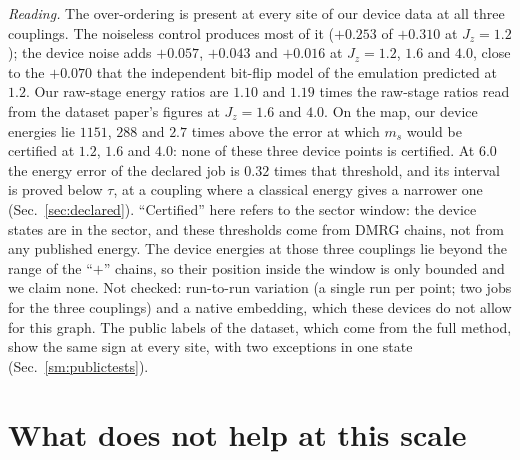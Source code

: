 \documentclass[aps,prx,onecolumn,10pt,nofootinbib,longbibliography,floatfix]{revtex4-2}
\theoremstyle{remark}
\newcommand{\Jz}{J_z}
\newcommand{\ms}{m_s}
\begin{document}
\emph{Reading.} The over-ordering is present at every site of our device data at all three couplings. The noiseless
control produces most of it ($+0.253$ of $+0.310$ at $\Jz=1.2$); the device noise adds $+0.057$, $+0.043$ and $+0.016$ at %
$\Jz=1.2$, $1.6$ and $4.0$, close to the $+0.070$ that the independent bit-flip model of the emulation predicted at %
$1.2$. Our raw-stage energy ratios are $1.10$ and $1.19$ times the raw-stage ratios read from the dataset paper's figures %
at $\Jz=1.6$ and $4.0$. On the map, our device energies lie $1151$, $288$ and $2.7$ times above the error at which $\ms$ %
would be certified at $1.2$, $1.6$ and $4.0$: none of these three device points is certified. At $6.0$ the energy error %
of the declared job is $0.32$ times that threshold, and its interval is proved below $\tau$, at a coupling where a %
classical energy gives a narrower one (Sec.~\ref{sec:declared}). ``Certified'' here refers to the sector window:
the device states are in the sector, and these thresholds come from DMRG chains, not from any published energy.
The device energies at those three couplings lie beyond the range of %
the ``$+$'' chains, so their position inside the window is only bounded and we claim none. Not checked: run-to-run
variation (a single run per point; two jobs for the three couplings) and a native embedding, which these devices do not allow for this graph.
The public labels of the dataset, which come from the full method, show the same sign at every site, with two
exceptions in one state (Sec.~\ref{sm:publictests}).

\section{What does not help at this scale}
\label{sm:nohelp}
\end{document}
